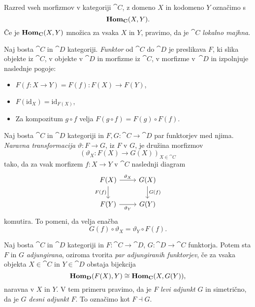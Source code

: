 \documentclass[../kategoricna_logika.tex]{subfiles}
\begin{document}
\begin{definicija}
  Razred vseh morfizmov v kategoriji $\cat{C}$, z domeno $X$ in kodomeno $Y$ označimo s
  \[ \mathbf{Hom}_{{\operatorname{\mathbf{C}}}}(X,Y).\]
  Če je $\mathbf{Hom}_{{\operatorname{\mathbf{C}}}}(X,Y)$ množica za vsaka $X$ in $Y$, pravimo, da je $\cat{C}$
  \emph{lokalno majhna}.
\end{definicija}
\begin{definicija}
  Naj bosta $\cat{C}$ in $\cat{D}$ kategoriji. \emph{Funktor} od $\cat{C}$ do $\cat{D}$
  je preslikava $F$, ki slika objekte iz $\cat{C}$, v objekte v $\cat{D}$ in morfizme iz
  $\cat{C}$, v morfizme v~$\cat{D}$ in izpolnjuje naslednje pogoje:
  \begin{itemize}
  \item $F(f : X \to Y) = F(f) : F(X) \to F(Y)$,
\item $F(\mathrm{id}_X) = \mathrm{id}_{F(X)}$,
\item Za kompozitum $g \circ f$ velja $F(g \circ f) = F(g) \circ F(f)$.
  \end{itemize}
\end{definicija}
\begin{definicija}
  Naj bosta $\cat{C}$ in $\cat{D}$ kategoriji in $F,G : \cat{C} \to \cat{D}$ par funktorjev
  med njima. \emph{Naravna transformacija} $\vartheta : F \to G$, iz $F$ v $G$, je
  družina morfizmov
  \[ (\vartheta_X : F(X) \to G(X))_{X \in \cat{C}}\]
  tako, da za vsak morfizem $f : X \to Y$ v $\cat{C}$ naslednji diagram
  \begin{equation*}
    \begin{tikzcd}
      F(X) \ar[d, "F(f)"'] \ar[r, "\vartheta_X"] & G(X) \ar[d, "G(f)"] \\
      F(Y) \ar[r, "\vartheta_Y"'] & G(Y)
    \end{tikzcd}
  \end{equation*}
  komutira. To pomeni, da velja enačba
  \[ G(f) \circ \vartheta_X = \vartheta_Y \circ F(f).\]
\end{definicija}
\begin{definicija}
  Naj bosta $\cat{C}$ in $\cat{D}$ kategoriji in $F : \cat{C} \to \cat{D}$, $G : \cat{D} \to \cat{C}$
  funktorja. Potem sta $F$ in $G$ \emph{adjungirana}, oziroma tvorita
  \emph{par adjungiranih funktorjev}, če za vsaka objekta $X \in \cat{C}$ in $Y \in \cat{D}$
  obstaja bijekcija
  \[ \mathbf{Hom}_{{\operatorname{\mathbf{D}}}}(F(X), Y) \cong \mathbf{Hom}_{{\operatorname{\mathbf{C}}}}(X, G(Y)),\]
  naravna v $X$ in $Y$.
  V tem primeru pravimo, da je $F$ \emph{levi adjunkt} $G$ in simetrično, da je $G$
  \emph{desni adjunkt} $F$. To označimo kot $F \dashv G$.
\end{definicija}
\end{document}
